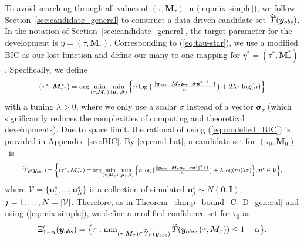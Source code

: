 \documentclass[12pt]{article}
\theoremstyle{shortspace}
\def\*#1{\bm{#1}}
\begin{document}
To avoid searching through all values of $(\tau,\*M_\tau)$ in (\ref{eq:mix-simple}), 
we follow  Section~\ref{sec:candidate_general} to construct a data-driven 
candidate set $\widehat {\it \Upsilon}(\*y_{obs})$. In the notation of  Section~\ref{sec:candidate_general}, the target parameter for the development is $\eta = (
\tau, \*M_\tau)$. 
Corresponding to (\ref{eq:tau-star}), we use  a modified BIC as our lost function and define 
our many-to-one mapping for $\eta^* = (\tau^*, \*M^*_\tau)$. Specifically, we define
\begin{equation}
    \label{eq:modefied_BIC}
    \resizebox{.8\hsize}{!}{$(\tau^*, \*M^*_{\tau^*}) =\arg\min\limits_{(\tau, \*M_\tau)} \min\limits_{(\*\mu_\tau, \bar\sigma)}  \left\{n\log \big(\frac{\|\*y_{obs} - {\*M}_{\tau} {\*\mu}_{\tau} - \bar\sigma \*u^*\|^2
+1}{n}\big) + 2\lambda\tau\log(n)\right\}$}
\end{equation}
with a tuning $\lambda > 0$, where we only use a scalar $\bar \sigma$ instead of a vector $\*\sigma_\tau$ (which significantly reduces the complexities of computing and theoretical developments). 
Due to space limit, 
the rational of using (\ref{eq:modefied_BIC}) is provided in Appendix~\ref{sec:BIC}.
By \eqref{eq:cand-hat}, a  candidate set for $(\tau_0, \*M_0)$~is 
\begin{align}
\label{eq:candidate_M}
\resizebox{0.92\hsize}{!}{$\widehat{\it \Upsilon}_{{\mathcal V}}(\*y_{obs}) 
  =  \bigg\{ 
  (\tau^*, \*M^*_{\tau^*})  
  ={\footnotesize \arg\min\limits_{(\tau, \*M_\tau)} \min\limits_{(\*\mu_\tau, \bar\sigma)}  \bigg\{n\log \big(\frac{\|\*y_{obs} - {\*M}_{\tau} {\*\mu}_{\tau} - \bar \sigma \*u^s \|^2
+1}{n}\big) +
\lambda\log(n)(2\tau)
  \bigg\}, 
 \*u^s \in {\mathcal V}
  \bigg\}},$}
\end{align}
where ${\mathcal V} = \{\*u_1^s, \ldots, \*u_N^s\}$ is a collection of simulated $\*u_j^s\sim N(\*0, \*I)$, $j = 1, \ldots, N = |{\cal V}|$. 
Therefore, as in Theorem~\ref{thm:p_bound_C_D_general} and using (\ref{eq:mix-simple}),
we define a modified confidence set for $\tau_0$ as
\begin{align}
\label{eq:cs_mixture}
\Xi'_{1-\alpha}(\*y_{obs}) = \big\{\tau: \min\nolimits_{(\tau, {\*M}_\tau) \in \widehat{\it \Upsilon}_{{\mathcal V}}(\*y_{obs})}\widetilde T(\*y_{obs}, (\tau,{\*M_\tau}))\leq 1-\alpha \big\}.
\end{align}
\end{document}
